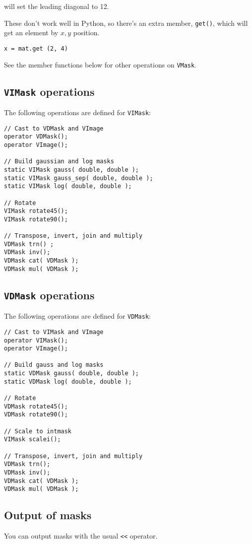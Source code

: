 \noindent
will set the leading diagonal to 12.

These don't work well in Python, so there's an extra member, \verb+get()+,
which will get an element by $x,y$ position.

\begin{verbatim}
x = mat.get (2, 4)
\end{verbatim}

See the member functions below for other operations on \verb+VMask+.

\subsection{\texttt{VIMask} operations}

The following operations are defined for \verb+VIMask+:

\begin{verbatim}
// Cast to VDMask and VImage
operator VDMask();
operator VImage();

// Build gaussian and log masks
static VIMask gauss( double, double );
static VIMask gauss_sep( double, double );
static VIMask log( double, double );

// Rotate
VIMask rotate45();
VIMask rotate90();

// Transpose, invert, join and multiply
VDMask trn() ;
VDMask inv();
VDMask cat( VDMask );
VDMask mul( VDMask );
\end{verbatim}

\subsection{\texttt{VDMask} operations}

The following operations are defined for \verb+VDMask+:

\begin{verbatim}
// Cast to VIMask and VImage
operator VIMask();
operator VImage();

// Build gauss and log masks
static VDMask gauss( double, double );
static VDMask log( double, double );

// Rotate
VDMask rotate45();
VDMask rotate90(); 

// Scale to intmask
VIMask scalei();

// Transpose, invert, join and multiply
VDMask trn();
VDMask inv();
VDMask cat( VDMask );
VDMask mul( VDMask );
\end{verbatim}

\subsection{Output of masks}

You can output masks with the usual \verb+<<+ operator.
